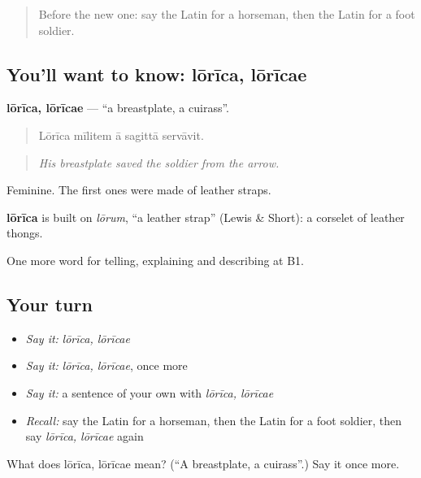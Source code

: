 \begin{quote}
Before the new one: say the Latin for a horseman, then the Latin for a foot soldier.
\end{quote}

\subsection*{You'll want to know: lōrīca, lōrīcae}
\textbf{lōrīca, lōrīcae} — \textquotedblleft{}a breastplate, a cuirass\textquotedblright{}.

\begin{quote}
Lōrīca mīlitem ā sagittā servāvit.
\end{quote}

\begin{quote}
\emph{His breastplate saved the soldier from the arrow.}
\end{quote}

Feminine. The first ones were made of leather straps.

\begin{cousinweb}
\textbf{lōrīca} is built on \emph{lōrum}, \textquotedblleft{}a leather strap\textquotedblright{} (Lewis \& Short): a corselet of leather thongs.
\end{cousinweb}

\begin{grammarlens}[title={What you've built}]
One more word for telling, explaining and describing at B1.
\end{grammarlens}

\subsection*{Your turn}
\begin{itemize}
\raggedright
  \item \emph{Say it:} \emph{lōrīca, lōrīcae}
  \item \emph{Say it:} \emph{lōrīca, lōrīcae}, once more
  \item \emph{Say it:} a sentence of your own with \emph{lōrīca, lōrīcae}
  \item \emph{Recall:} say the Latin for a horseman, then the Latin for a foot soldier, then say \emph{lōrīca, lōrīcae} again
\end{itemize}

\begin{tcolorbox}[breakable,colback=teal!4,colframe=teal!35!black,title={Before you move on}]
What does lōrīca, lōrīcae mean? (\textquotedblleft{}A breastplate, a cuirass\textquotedblright{}.) Say it once more.
\end{tcolorbox}
